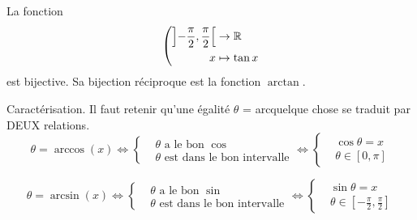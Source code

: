 \begin{defi}
 La fonction
\begin{displaymath}
 \left(
\begin{aligned}
 \left] -\frac{\pi}{2},\frac{\pi}{2}\right[   &\rightarrow \mathbb{R} \\x &\mapsto \tan x
\end{aligned}
\right. 
\end{displaymath}
est bijective. Sa bijection réciproque est la fonction $\arctan$.
\end{defi}

Caractérisation. Il faut retenir qu'une égalité $\theta$ = arcquelque chose se traduit par DEUX relations.
\begin{displaymath}
 \theta = \arccos(x)\Leftrightarrow
\left\lbrace 
\begin{aligned}
 &\theta \text{ a le bon } \cos \\ &\theta \text{ est dans le bon intervalle}
\end{aligned}
\right. 
\Leftrightarrow
\left\lbrace 
\begin{aligned}
 &\cos \theta = x \\ &\theta \in [0,\pi]
\end{aligned}
\right. 
\end{displaymath}

\begin{displaymath}
 \theta = \arcsin(x)\Leftrightarrow
\left\lbrace 
\begin{aligned}
 &\theta \text{ a le bon } \sin \\ &\theta \text{ est dans le bon intervalle}
\end{aligned}
\right. 
\Leftrightarrow
\left\lbrace 
\begin{aligned}
 &\sin \theta = x \\ &\theta \in \left[ -\frac{\pi}{2},\frac{\pi}{2}\right] 
\end{aligned}
\right. 
\end{displaymath}

